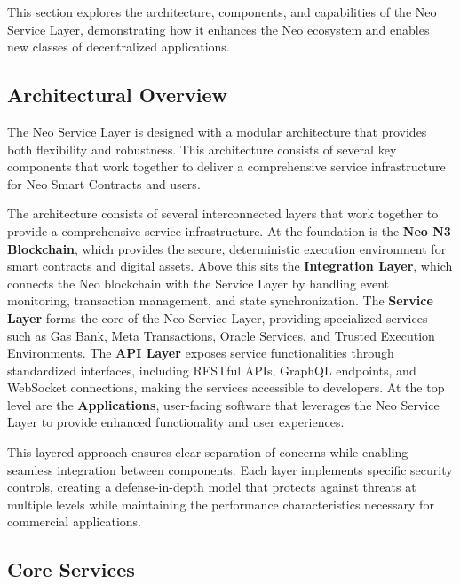 \documentclass{article}
\begin{document}
This section explores the architecture, components, and capabilities of the Neo Service Layer, demonstrating how it enhances the Neo ecosystem and enables new classes of decentralized applications.

\subsection{Architectural Overview}
\label{subsec:nsl-architecture}

The Neo Service Layer is designed with a modular architecture that provides both flexibility and robustness. This architecture consists of several key components that work together to deliver a comprehensive service infrastructure for Neo Smart Contracts and users.



The architecture consists of several interconnected layers that work together to provide a comprehensive service infrastructure. At the foundation is the \textbf{Neo N3 Blockchain}, which provides the secure, deterministic execution environment for smart contracts and digital assets. Above this sits the \textbf{Integration Layer}, which connects the Neo blockchain with the Service Layer by handling event monitoring, transaction management, and state synchronization. The \textbf{Service Layer} forms the core of the Neo Service Layer, providing specialized services such as Gas Bank, Meta Transactions, Oracle Services, and Trusted Execution Environments. The \textbf{API Layer} exposes service functionalities through standardized interfaces, including RESTful APIs, GraphQL endpoints, and WebSocket connections, making the services accessible to developers. At the top level are the \textbf{Applications}, user-facing software that leverages the Neo Service Layer to provide enhanced functionality and user experiences.

This layered approach ensures clear separation of concerns while enabling seamless integration between components. Each layer implements specific security controls, creating a defense-in-depth model that protects against threats at multiple levels while maintaining the performance characteristics necessary for commercial applications.

\subsection{Core Services}
\label{subsec:nsl-core-services}
\end{document}
